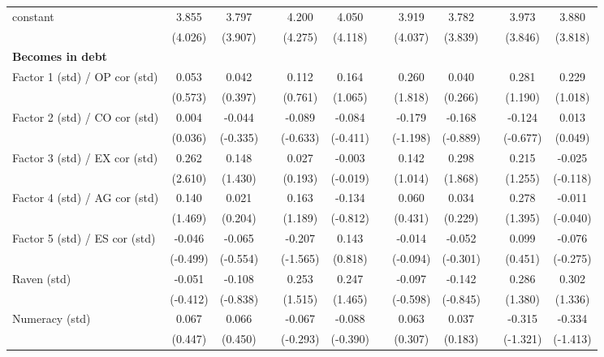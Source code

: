{\begin{longtable}{@{\extracolsep{\fill}}lccccccccccc}
    constant & 3.855 & 3.797 &       & 4.200 & 4.050 &       & 3.919 & 3.782 &       & 3.973 & 3.880 \\
          & (4.026) & (3.907) &       & (4.275) & (4.118) &       & (4.037) & (3.839) &       & (3.846) & (3.818) \\
    \midrule
    \textbf{Becomes in debt} &       &       &       &       &       &       &       &       &       &       &  \\
    Factor 1 (std) / OP cor (std) & 0.053 & 0.042 &       & 0.112 & 0.164 &       & 0.260 & 0.040 &       & 0.281 & 0.229 \\
          & (0.573) & (0.397) &       & (0.761) & (1.065) &       & (1.818) & (0.266) &       & (1.190) & (1.018) \\
    Factor 2 (std) / CO cor (std) & 0.004 & -0.044 &       & -0.089 & -0.084 &       & -0.179 & -0.168 &       & -0.124 & 0.013 \\
          & (0.036) & (-0.335) &       & (-0.633) & (-0.411) &       & (-1.198) & (-0.889) &       & (-0.677) & (0.049) \\
    Factor 3 (std) / EX cor (std) & 0.262 & 0.148 &       & 0.027 & -0.003 &       & 0.142 & 0.298 &       & 0.215 & -0.025 \\
          & (2.610) & (1.430) &       & (0.193) & (-0.019) &       & (1.014) & (1.868) &       & (1.255) & (-0.118) \\
    Factor 4 (std) / AG cor (std) & 0.140 & 0.021 &       & 0.163 & -0.134 &       & 0.060 & 0.034 &       & 0.278 & -0.011 \\
          & (1.469) & (0.204) &       & (1.189) & (-0.812) &       & (0.431) & (0.229) &       & (1.395) & (-0.040) \\
    Factor 5 (std) / ES cor (std) & -0.046 & -0.065 &       & -0.207 & 0.143 &       & -0.014 & -0.052 &       & 0.099 & -0.076 \\
          & (-0.499) & (-0.554) &       & (-1.565) & (0.818) &       & (-0.094) & (-0.301) &       & (0.451) & (-0.275) \\
    Raven (std) & -0.051 & -0.108 &       & 0.253 & 0.247 &       & -0.097 & -0.142 &       & 0.286 & 0.302 \\
          & (-0.412) & (-0.838) &       & (1.515) & (1.465) &       & (-0.598) & (-0.845) &       & (1.380) & (1.336) \\
    Numeracy (std) & 0.067 & 0.066 &       & -0.067 & -0.088 &       & 0.063 & 0.037 &       & -0.315 & -0.334 \\
          & (0.447) & (0.450) &       & (-0.293) & (-0.390) &       & (0.307) & (0.183) &       & (-1.321) & (-1.413) \\

\end{longtable}}
